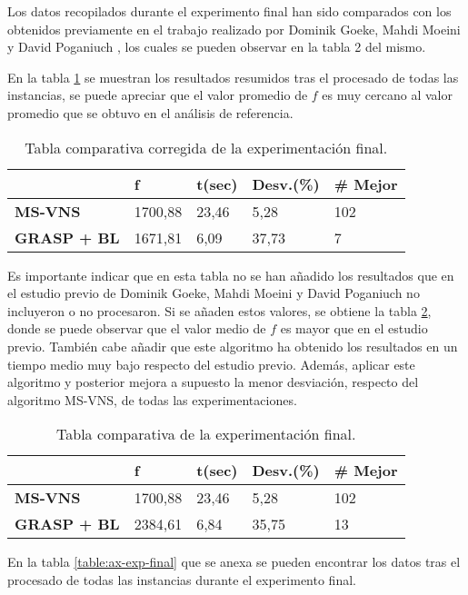 Los datos recopilados durante el experimento final han sido comparados con los obtenidos previamente en el trabajo realizado por Dominik Goeke, Mahdi Moeini y David Poganiuch \cite{mrcp-GOEKE2017283}, los cuales se pueden observar en la tabla 2 del mismo. 

En la tabla \ref{tab:final-corregida} se muestran los resultados resumidos tras el procesado de todas las instancias, se puede apreciar que el valor promedio de $f$ es muy cercano al valor promedio que se obtuvo en el análisis de referencia.

\begin{table}[H]
	\centering
	\begin{tabular}{lllll}
		\hline
		\textbf{}           & \textbf{f} & \textbf{t(sec)} & \textbf{Desv.(\%)} & \textbf{\# Mejor} \\ \hline
		\textbf{MS-VNS}     & 1700,88    & 23,46           & 5,28               & 102               \\
		\textbf{GRASP + BL} & 1671,81    & 6,09            & 37,73              & 7\\ \hline             
	\end{tabular}
	\caption{Tabla comparativa corregida de la experimentación final.}
	\label{tab:final-corregida}
\end{table}

Es importante indicar que en esta tabla no se han añadido los resultados que en el estudio previo de Dominik Goeke, Mahdi Moeini y David Poganiuch no incluyeron o no procesaron. Si se añaden estos valores, se obtiene la tabla \ref{tab:final-completa}, donde se puede observar que el valor medio de $f$ es mayor que en el estudio previo. También cabe añadir que este algoritmo ha obtenido los resultados en un tiempo medio muy bajo respecto del estudio previo. Además, aplicar este algoritmo y posterior mejora a supuesto la menor desviación, respecto del algoritmo MS-VNS, de todas las experimentaciones.

\begin{table}[H]
	\centering
	\begin{tabular}{lllll}
		\hline
		\textbf{}           & \textbf{f} & \textbf{t(sec)} & \textbf{Desv.(\%)} & \textbf{\# Mejor} \\ \hline
		\textbf{MS-VNS}     & 1700,88    & 23,46           & 5,28               & 102               \\
		\textbf{GRASP + BL} & 2384,61    & 6,84            & 35,75              & 13 \\ \hline               
	\end{tabular}
	\caption{Tabla comparativa de la experimentación final.}
	\label{tab:final-completa}
\end{table}

En la tabla \ref{table:ax-exp-final} que se anexa se pueden encontrar los datos tras el procesado de todas las instancias durante el experimento final.
